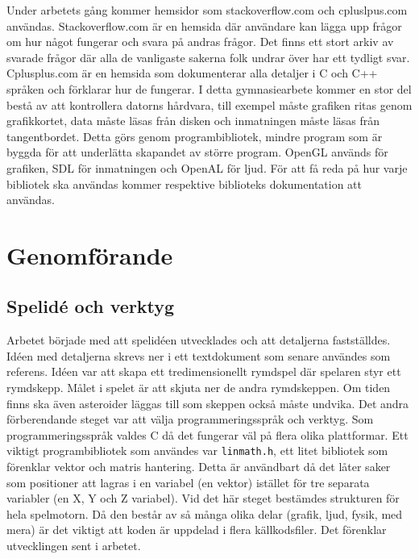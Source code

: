\documentclass[12pt, a4paper]{article}
\newcommand{\code}{\texttt}
\begin{document}
	Under arbetets gång kommer hemsidor som stackoverflow.com och cpluslpus.com användas. Stackoverflow.com är en hemsida där användare kan lägga upp frågor om hur något fungerar och svara på andras frågor. Det finns ett stort arkiv av svarade frågor där alla de vanligaste sakerna folk undrar över har ett tydligt svar. Cplusplus.com är en hemsida som dokumenterar alla detaljer i C och C++ språken och förklarar hur de fungerar. I detta gymnasiearbete kommer en stor del bestå av att kontrollera datorns hårdvara, till exempel måste grafiken ritas genom grafikkortet, data måste läsas från disken och inmatningen måste läsas från tangentbordet. Detta görs genom programbibliotek, mindre program som är byggda för att underlätta skapandet av större program. OpenGL används för grafiken, SDL för inmatningen och OpenAL för ljud. För att få reda på hur varje bibliotek ska användas kommer respektive biblioteks dokumentation att användas. 
	
	\newpage
	\section{Genomförande}
	
	\subsection{Spelidé och verktyg}
	
	Arbetet började med att spelidéen utvecklades och att detaljerna fastställdes. Idéen med detaljerna skrevs ner i ett textdokument som senare användes som referens. Idéen var att skapa ett tredimensionellt rymdspel där spelaren styr ett rymdskepp. Målet i spelet är att skjuta ner de andra rymdskeppen. Om tiden finns ska även asteroider läggas till som skeppen också måste undvika. Det andra förberendande steget var att välja programmeringsspråk och verktyg. Som programmeringsspråk valdes C då det fungerar väl på flera olika plattformar. Ett viktigt programbibliotek som användes var \code{linmath.h}, ett litet bibliotek som förenklar vektor och matris hantering. Detta är användbart då det låter saker som positioner att lagras i en variabel (en vektor) istället för tre separata variabler (en X, Y och Z variabel). Vid det här steget bestämdes strukturen för hela spelmotorn. Då den består av så många olika delar (grafik, ljud, fysik, med mera) är det viktigt att koden är uppdelad i flera källkodsfiler. Det förenklar utvecklingen sent i arbetet. 
	
\end{document}
